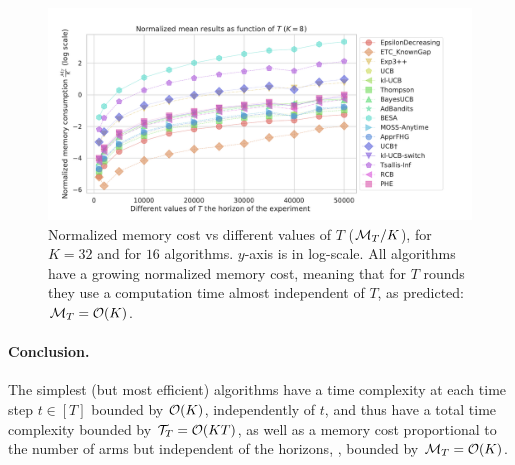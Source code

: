 \begin{figure}[h!]  %
	\includegraphics[width=1.10\linewidth]{16_different_algorithms__lognormmemory_vs_times__16pb__K8.pdf}
	\caption[Normalized memory cost vs different values of $T$.]{
        Normalized memory cost vs different values of $T$ ($\mathcal{M}_T / K$),
        for $K=32$ and for $16$ algorithms.
        $y$-axis is in log-scale.
        All algorithms have a growing normalized memory cost, meaning that for $T$ rounds they use a computation time almost independent of $T$, as predicted: $\mathcal{M}_T = \mathop{}\mathopen{}\mathcal{O}\mathopen{}\left(K\right)$.
	}
	\label{fig:3:16_different_algorithms__lognormmemory_vs_times__16pb__K8}
\end{figure}




\paragraph{Conclusion.}
%
The simplest (but most efficient) algorithms have
a time complexity at each time step $t\in[T]$ bounded by $\mathop{}\mathopen{}\mathcal{O}\mathopen{}\left(K\right)$, independently of $t$, and thus have a total time complexity bounded by $\mathcal{T}_T = \mathop{}\mathopen{}\mathcal{O}\mathopen{}\left(KT\right)$,
as well as a memory cost proportional to the number of arms but independent of the horizons, \ie, bounded by $\mathcal{M}_T = \mathop{}\mathopen{}\mathcal{O}\mathopen{}\left(K\right)$.

